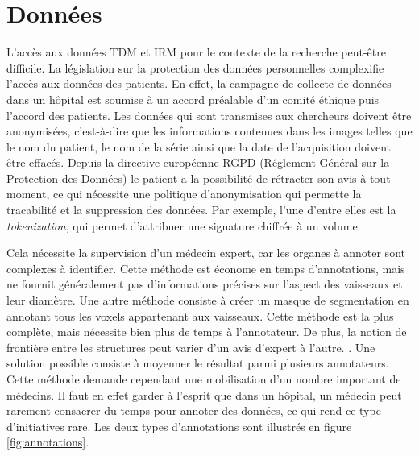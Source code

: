 \section{Données}

L'accès aux données TDM et IRM pour le contexte de la recherche  peut-être difficile. La législation sur la protection des données personnelles complexifie l'accès aux données des patients. En effet, la campagne de collecte de données dans un hôpital est soumise à un accord préalable d'un comité éthique puis l'accord des patients. Les données qui sont transmises aux chercheurs doivent être anonymisées, c'est-à-dire que les informations contenues dans les images telles que le nom du patient, le nom de la série ainsi que la date de l'acquisition doivent être effacés. Depuis la  directive européenne RGPD (Réglement Général sur la Protection des Données) le patient a la possibilité de rétracter son avis à tout moment, ce qui nécessite une politique d'anonymisation qui permette la tracabilité et la suppression des données. Par exemple, l'une d'entre elles est la \textit{tokenization}, qui permet d'attribuer une signature chiffrée à un volume.

 Cela nécessite la supervision d'un médecin expert, car les organes à annoter sont complexes à identifier.  Cette méthode est économe en temps d'annotations, mais ne fournit généralement pas d'informations précises sur l'aspect des vaisseaux et leur diamètre. 
Une autre méthode consiste à créer un masque de segmentation en annotant tous les voxels appartenant aux vaisseaux. Cette méthode est la plus complète, mais nécessite bien plus de temps à l'annotateur. De plus, la notion de frontière entre les structures peut varier d'un avis d'expert à l'autre. . Une solution possible consiste à moyenner le résultat parmi plusieurs annotateurs. Cette méthode demande cependant une mobilisation d'un nombre important de médecins. Il faut en effet garder à l'esprit que dans un hôpital, un médecin peut rarement consacrer du temps pour annoter des données, ce qui rend ce type d'initiatives rare. Les deux types d'annotations sont illustrés en figure \ref{fig:annotations}. 

